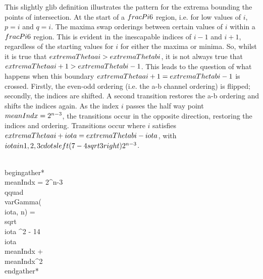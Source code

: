 This slightly glib definition illustrates the pattern for the extrema bounding the points of intersection. At the start of a $\\frac{\\Pi}{6}$ region, i.e. for low values of $i$, $p=i$ and $q=i$. The maxima swap orderings between certain values of $i$ within a $\\frac{\\Pi}{6}$ region. This is evident in the inescapable indices of $i-1$ and $i+1$, regardless of the starting values for $i$ for either the maxima or minima. So, whilst it is true that $\\extremaTheta{a} {i} > \\extremaTheta{b} {i}$, it is not always true that $\\extremaTheta{a} {i+1} > \\extremaTheta{b} {i-1}$. This leads to the question of what happens when this boundary $\\extremaTheta{a} {i+1} = \\extremaTheta{b} {i-1}$ is crossed. Firstly, the even-odd ordering (i.e. the a-b channel ordering) is flipped; secondly, the indices are shifted. A second transition restores the a-b ordering and shifts the indices again. As the index $i$ passes the half way point $\\meanIndx = 2^{n-3}$, the transitions occur in the opposite direction, restoring the indices and ordering. Transitions occur where $i$ satisfies $\\extremaTheta{a} {i+\\iota} = \\extremaTheta{b} {i-\\iota}$, with $\\iota \\in \\{ 1,2,3 \\cdots \\left(7-4 \\sqrt{3}\\right) 2^{n-3}\\} $. 

\\begin{gather*}
\\meanIndx = 2^{n-3} \\qquad
\\varGamma(\\iota, n) = \\sqrt{\\iota ^2 - 14 \\iota \\meanIndx + \\meanIndx^{2} } 
\\end{gather*}

